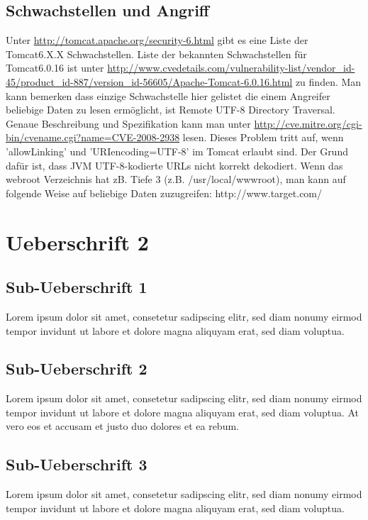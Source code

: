 \documentclass[12pt,a4paper,titlepage,oneside]{scrartcl}
\begin{document}
\subsection{Schwachstellen und Angriff}
Unter \url{http://tomcat.apache.org/security-6.html} gibt es eine Liste der Tomcat6.X.X Schwachstellen. Liste der bekannten Schwachstellen für Tomcat6.0.16 ist unter \url{http://www.cvedetails.com/vulnerability-list/vendor_id-45/product_id-887/version_id-56605/Apache-Tomcat-6.0.16.html} zu finden. Man kann bemerken dass einzige Schwachstelle hier gelistet die einem Angreifer beliebige Daten zu lesen ermöglicht, ist Remote UTF-8 Directory Traversal. Genaue Beschreibung und Spezifikation kann man unter \url{http://cve.mitre.org/cgi-bin/cvename.cgi?name=CVE-2008-2938} lesen. Dieses Problem tritt auf, wenn 'allowLinking' und 'URIencoding=UTF-8' im Tomcat erlaubt sind. Der Grund dafür ist, dass JVM UTF-8-kodierte URLs nicht korrekt dekodiert. Wenn das webroot Verzeichnis hat zB. Tiefe 3 (z.B. /usr/local/wwwroot), man kann auf folgende Weise auf beliebige Daten zuzugreifen: http://www.target.com/%


\section{Ueberschrift 2}

\subsection{Sub-Ueberschrift 1}
Lorem ipsum dolor sit amet, consetetur sadipscing elitr, sed diam nonumy eirmod tempor invidunt ut labore et dolore magna aliquyam erat, sed diam voluptua. 

\subsection{Sub-Ueberschrift 2}
Lorem ipsum dolor sit amet, consetetur sadipscing elitr, sed diam nonumy eirmod tempor invidunt ut labore et dolore magna aliquyam erat, sed diam voluptua. At vero eos et accusam et justo duo dolores et ea rebum. 

\subsection{Sub-Ueberschrift 3}
Lorem ipsum dolor sit amet, consetetur sadipscing elitr, sed diam nonumy eirmod tempor invidunt ut labore et dolore magna aliquyam erat, sed diam voluptua. 
\end{document}
